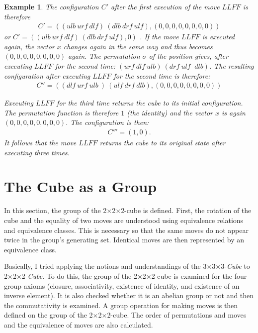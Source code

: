 \documentclass[12pt,a4paper]{article}
\theoremstyle{custom}
\newtheorem*{example}{Example}
\newcommand{\Ttwo}{2$\times$2$\times$2-}
\newcommand{\Tthree}{3$\times$3$\times$3-}
\begin{document}
\begin{example}
The configuration $C'$ after the first execution of the  move $LLFF$ is therefore
\begin{align*}
C' = ((\textit{ulb} \ \textit{urf} \ \textit{dlf} )\ ( \textit{dlb} \ \textit{drf} \ \textit{ulf} ),(0,0,0,0,0,0,0,0))
\end{align*} 
or  $C' = ((\textit{ulb} \ \textit{urf} \ \textit{dlf} ) \ (\textit{dlb} \ \textit{drf} \ \textit{ulf} ),0)$ . If the move $LLFF$ is executed again, the vector $x$ changes again in the same way and thus becomes $(0,0,0,0,0,0,0,0)$ again. The permutation $\sigma$ of the position gives, after executing $LLFF$ for the second time: $(\textit{urf} \ \textit{dlf} \ \textit{ulb}) \ ( \textit{drf} \ \textit{ulf } \ \textit{dlb} )$. The resulting configuration after executing $LLFF$ for the second time is therefore:
\begin{align*}
C'' = (( \textit{dlf} \ \textit{urf} \ \textit{ulb} \ ) \ ( \textit{ulf} \ \textit{drf} \ \textit{dlb} ),(0,0 ,0,0,0,0,0,0))
\end{align*}

Executing $LLFF$ for the third time returns the cube to its initial configuration. The permutation function is therefore $1$ (the identity) and the vector $x$ is again $(0,0,0,0,0,0,0,0)$. The configuration is then:
\begin{align*}
C''' = (1,0).
\end{align*}
It follows that the move $LLFF$ returns the cube to its original state after executing three times.
\end{example}


\section{The Cube as a Group}
\label{Chapter_CubeAsGroup}

In this section, the group of the \Ttwo cube is defined. First, the rotation of the cube and the equality of two moves are understood using equivalence relations and equivalence classes. This is necessary so that the same moves do not appear twice in the group's generating set. Identical moves are then represented by an equivalence class.

Basically, I tried applying the notions and understandings of the \Tthree \textit{Cube} \cite{JC} to \Ttwo \textit{Cube}.
To do this, the group of the \Ttwo cube is examined for the four group axioms (closure, associativity, existence of identity, and existence of an inverse element). It is also checked whether it is an abelian group or not and then the commutativity is examined. A group operation for making moves is then defined on the group of the \Ttwo cube. The order of permutations and moves and the equivalence of moves are also calculated.
\end{document}
